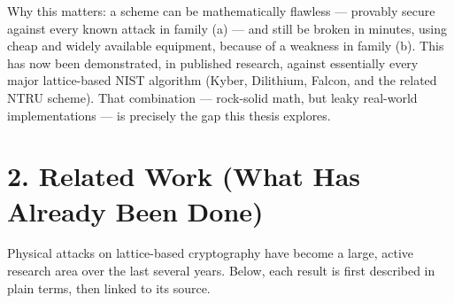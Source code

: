 \documentclass[11pt,a4paper]{article}
\begin{document}
Why this matters: a scheme can be mathematically flawless --- provably secure against every known attack in family (a) --- and still be broken in minutes, using cheap and widely available equipment, because of a weakness in family (b). This has now been demonstrated, in published research, against essentially every major lattice-based NIST algorithm (Kyber, Dilithium, Falcon, and the related NTRU scheme). That combination --- rock-solid math, but leaky real-world implementations --- is precisely the gap this thesis explores.

\section*{2. Related Work (What Has Already Been Done)}

Physical attacks on lattice-based cryptography have become a large, active research area over the last several years. Below, each result is first described in plain terms, then linked to its source.
\end{document}
